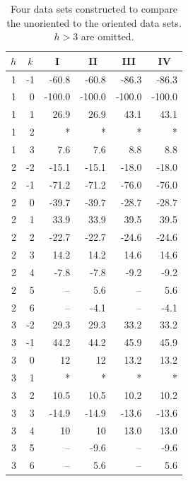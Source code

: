 \begin{table}[htbp]
  \centering
  \begin{tabular}{rrrrrr}
    \hline
    \multicolumn{1}{c}{$h$} & \multicolumn{1}{c}{$k$} & \multicolumn{1}{c}{I} & \multicolumn{1}{c}{II} & \multicolumn{1}{c}{III} & \multicolumn{1}{c}{IV} \\
    \hline    
    1      & -1     & -60.8  & -60.8  & -86.3  & -86.3  \\
    1      & 0      & -100.0 & -100.0 & -100.0 & -100.0 \\
    1      & 1      & 26.9   & 26.9   & 43.1   & 43.1   \\
    1      & 2      & *      & *      & *      & *      \\
    1      & 3      & 7.6    & 7.6    & 8.8    & 8.8    \\
    2      & -2     & -15.1  & -15.1  & -18.0  & -18.0  \\
    2      & -1     & -71.2  & -71.2  & -76.0  & -76.0  \\
    2      & 0      & -39.7  & -39.7  & -28.7  & -28.7  \\
    2      & 1      & 33.9   & 33.9   & 39.5   & 39.5   \\
    2      & 2      & -22.7  & -22.7  & -24.6  & -24.6  \\
    2      & 3      & 14.2   & 14.2   & 14.6   & 14.6   \\
    2      & 4      & -7.8   & -7.8   & -9.2   & -9.2   \\
    2      & 5      & --     & 5.6    & --     & 5.6    \\
    2      & 6      & --     & -4.1   & --     & -4.1   \\
    3      & -2     & 29.3   & 29.3   & 33.2   & 33.2   \\
    3      & -1     & 44.2   & 44.2   & 45.9   & 45.9   \\
    3      & 0      & 12     & 12     & 13.2   & 13.2   \\
    3      & 1      & *      & *      & *      & *      \\
    3      & 2      & 10.5   & 10.5   & 10.2   & 10.2   \\
    3      & 3      & -14.9  & -14.9  & -13.6  & -13.6  \\
    3      & 4      & 10     & 10     & 13.0   & 13.0   \\
    3      & 5      & --     & -9.6   & --     & -9.6   \\
    3      & 6      & --     & 5.6    & --     & 5.6    \\
    \hline
  \end{tabular}%
  \caption{Four data sets constructed to compare the unoriented to
  the oriented data sets. $h > 3$ are omitted.}
  \label{tab:cmu_vs_wackwebb1}%
\end{table}%

